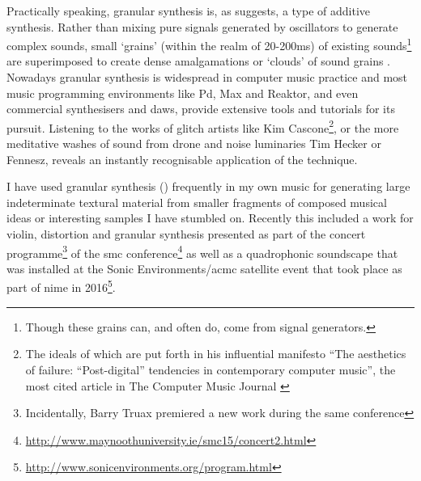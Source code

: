 Practically speaking, granular synthesis is, as \cite{Roads1998} suggests, a type of additive synthesis. Rather than mixing pure signals generated by oscillators to generate complex sounds, small `grains' (within the realm of 20-200ms) of existing sounds\footnote{Though these grains can, and often do, come from signal generators.} are superimposed to create dense amalgamations or `clouds' of sound grains \citep{Collins2011a, Thomson2004}. Nowadays granular synthesis is widespread in computer music practice and most music programming environments like Pd, Max and Reaktor, and even commercial synthesisers and \acrshort{daw}s,  provide extensive tools and tutorials for its pursuit. Listening to the works of glitch artists like Kim Cascone\footnote{The ideals of which are put forth in his influential manifesto ``The aesthetics of failure: ``Post-digital'' tendencies in contemporary computer music'', the most cited article in The Computer Music Journal \citep{Cascone2000}}\citep{Latartara2010}, or the more meditative washes of sound from drone and noise luminaries Tim Hecker or Fennesz, reveals an instantly recognisable application of the technique. 

I have used granular synthesis () frequently in my own music for generating large indeterminate textural material from smaller fragments of composed musical ideas or interesting samples I have stumbled on. Recently this included a work  for violin, distortion and granular synthesis presented as part of the concert programme\footnote{Incidentally, Barry Truax premiered a new work during the same conference} of the \acrfull{smc} conference\footnote{\url{http://www.maynoothuniversity.ie/smc15/concert2.html}} as well as a quadrophonic soundscape that was installed at the Sonic Environments/\acrfull{acmc} satellite event that took place as part of \acrfull{nime} in 2016\footnote{\url{http://www.sonicenvironments.org/program.html}}. 

